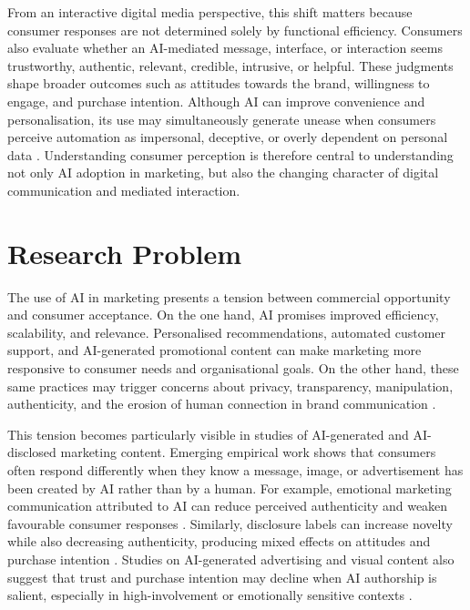 From an interactive digital media perspective, this shift matters because consumer responses are not determined solely by functional efficiency. Consumers also evaluate whether an AI-mediated message, interface, or interaction seems trustworthy, authentic, relevant, credible, intrusive, or helpful. These judgments shape broader outcomes such as attitudes towards the brand, willingness to engage, and purchase intention. Although AI can improve convenience and personalisation, its use may simultaneously generate unease when consumers perceive automation as impersonal, deceptive, or overly dependent on personal data \cite{kumar2024aipowered,mohdamin2025adoption}. Understanding consumer perception is therefore central to understanding not only AI adoption in marketing, but also the changing character of digital communication and mediated interaction.

\section{Research Problem}
The use of AI in marketing presents a tension between commercial opportunity and consumer acceptance. On the one hand, AI promises improved efficiency, scalability, and relevance. Personalised recommendations, automated customer support, and AI-generated promotional content can make marketing more responsive to consumer needs and organisational goals. On the other hand, these same practices may trigger concerns about privacy, transparency, manipulation, authenticity, and the erosion of human connection in brand communication \cite{ubal2024framework,hermann2024consumer}.

This tension becomes particularly visible in studies of AI-generated and AI-disclosed marketing content. Emerging empirical work shows that consumers often respond differently when they know a message, image, or advertisement has been created by AI rather than by a human. For example, emotional marketing communication attributed to AI can reduce perceived authenticity and weaken favourable consumer responses \cite{kirk2025aiauthorship}. Similarly, disclosure labels can increase novelty while also decreasing authenticity, producing mixed effects on attitudes and purchase intention \cite{shi2026disclosure}. Studies on AI-generated advertising and visual content also suggest that trust and purchase intention may decline when AI authorship is salient, especially in high-involvement or emotionally sensitive contexts \cite{israfilzade2025advertising,belanche2025images,zhang2025images}.

